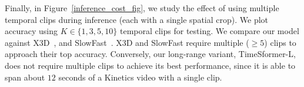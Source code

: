 \documentclass{article}
\begin{document}


Finally, in Figure~\ref{inference_cost_fig}, we study the effect of using multiple temporal clips during inference (each with a single spatial crop). We plot accuracy using $K \in \{1, 3, 5, 10\}$ temporal clips for testing. We compare our model against X3D~\cite{feichtenhofer2020x3d}, and SlowFast~\cite{slowfast}. X3D and SlowFast require multiple ($\geq 5$) clips to approach their top accuracy. Conversely, our long-range variant, TimeSformer-L, does not require multiple clips to achieve its best performance, since it is able to span about $12$ seconds of a Kinetics video with a single clip. 
\end{document}
